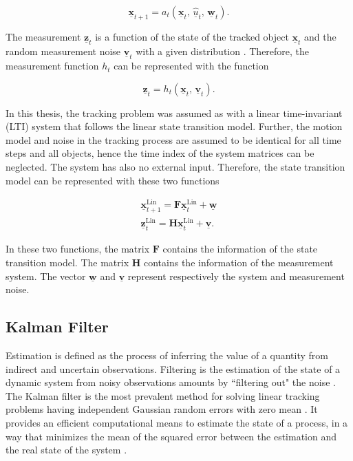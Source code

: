 \begin{equation}
    \boldsymbol{\underline{x}}_{t+1} = a_{t}(\boldsymbol{\underline{x}}_{t},\,\hat{\underline{u}}_{t},\,\boldsymbol{\underline{w}}_{t}).
\end{equation}

The measurement $\boldsymbol{\underline{z}}_{t}$ is a function of the state of the tracked object $\boldsymbol{\underline{x}}_{t}$ and the random measurement noise $\boldsymbol{\underline{v}}_{t}$ with a given distribution \cite{welch1995introduction}. Therefore, the measurement function $h_{t}$ can be represented with the function

\begin{equation}
    \boldsymbol{\underline{z}}_{t} = h_{t}(\boldsymbol{\underline{x}}_{t},\,\boldsymbol{\underline{v}}_{t}).
\end{equation}

In this thesis, the tracking problem was assumed as with a linear time-invariant (LTI) system that follows the linear state transition model. Further, the motion model and noise in the tracking process are assumed to be identical for all time steps and all objects, hence the time index of the system matrices can be neglected. The system has also no external input. Therefore, the state transition model can be represented with these two functions

\begin{gather}
    \boldsymbol{\underline{x}}_{t+1}^{\mathrm{Lin}} = \mathbf{F}\boldsymbol{\underline{x}}_{t}^{\mathrm{Lin}}+\boldsymbol{\underline{w}}\\
    \boldsymbol{\underline{z}}_{t}^{\mathrm{Lin}} = \mathbf{H}\boldsymbol{\underline{x}}_{t}^{\mathrm{Lin}}+\boldsymbol{\underline{v}}.
\end{gather}

In these two functions, the matrix $\mathbf{F}$ contains the information of the state transition model. The matrix $\mathbf{H}$ contains the information of the measurement system. The vector $\boldsymbol{\underline{w}}$ and $\boldsymbol{\underline{v}}$ represent respectively the system and measurement noise.


\subsection{Kalman Filter}
\label{kf}

Estimation is defined as the process of inferring the value of a quantity from indirect and uncertain observations. Filtering is the estimation of the state of a dynamic system from noisy observations amounts by ``filtering out" the noise \cite{bar2004estimation}. The Kalman filter is the most prevalent method for solving linear tracking problems having independent Gaussian random errors with zero mean \cite{stone2013bayesian}. It provides an efficient computational means to estimate the state of a process, in a way that minimizes the mean of the squared error between the estimation and the real state of the system  \cite{maybeck1982stochastic}. 

